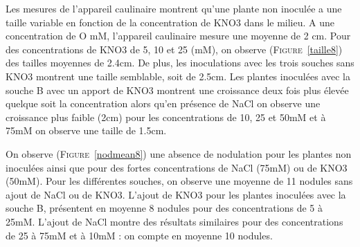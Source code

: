 \documentclass[12pt,a4paper,onecolumn]{article}
\begin{document}
\begin{multicols}{2}

			Les mesures de l’appareil caulinaire montrent qu’une plante non inoculée a une taille variable en fonction de la concentration de KNO3 dans le milieu. A une concentration de O mM, l'appareil caulinaire mesure une moyenne de 2 cm. Pour des concentrations de KNO3 de 5, 10 et 25 (mM), on observe (\textsc{Figure}~\ref{taille8}) des tailles moyennes de 2.4cm. De plus, les inoculations avec les trois souches sans KNO3 montrent une taille semblable, soit de 2.5cm. Les plantes inoculées avec la souche B avec un apport de KNO3 montrent une croissance deux fois plus élevée quelque soit la concentration alors qu’en présence de NaCl on observe une croissance plus faible (2cm) pour les concentrations de 10, 25 et 50mM et à 75mM on observe une taille de 1.5cm.


			On observe (\textsc{Figure}~\ref{nodmean8}) une absence de nodulation pour les plantes non inoculées ainsi que pour des fortes concentrations de NaCl (75mM) ou de KNO3 (50mM). Pour les différentes souches, on observe une moyenne de 11 nodules sans ajout de NaCl ou de KNO3. L’ajout de KNO3 pour les plantes inoculées avec la souche B, présentent en moyenne 8 nodules pour des concentrations de  5 à 25mM. L’ajout de NaCl montre des résultats similaires pour des concentrations de 25 à 75mM et à 10mM : on compte en moyenne 10 nodules.



\end{multicols}
\end{document}
